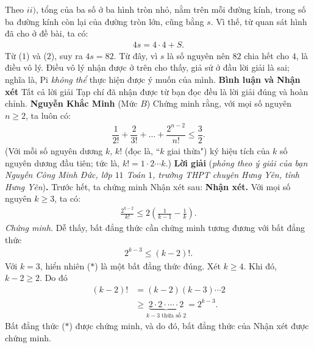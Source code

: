\begin{multicols}{2}
	\vskip 0.05cm
	Theo $ii)$, tổng của ba số ở ba hình tròn nhỏ, nằm trên mỗi đường kính, trong số ba đường kính còn lại của đường tròn lớn, cũng bằng $s$. Vì thế, từ quan sát hình đã cho ở đề bài, ta có:
	\begin{align*}
		4s = 4 \cdot 4 + S. \tag{$2$}
	\end{align*}
	Từ ($1$) và ($2$), suy ra $4s = 82$. Từ đây, vì $s$ là số nguyên nên $82$ chia hết cho $4$, là điều vô lý.
	\vskip 0.05cm
	Điều vô lý nhận được ở trên cho thấy, giả sử ở đầu lời giải là sai; nghĩa là, Pi \textit{không thể} thực hiện được ý muốn của mình.
	\vskip 0.05cm
	\textbf{\color{thachthuctoanhoc}Bình luận và Nhận xét}
	\vskip 0.05cm
	Tất cả lời giải Tạp chí đã nhận được từ bạn đọc đều là lời giải đúng và hoàn chỉnh.
	\vskip 0.15cm
	\hfill	\textbf{\color{thachthuctoanhoc}Nguyễn Khắc Minh}
	\vskip 0.15cm
	{}
	(Mức $B$) Chứng minh rằng, với mọi số nguyên $n\ge2$, ta luôn có:
	\begin{align*}
		\dfrac{1}{2!}+\dfrac{2}{3!}+\ldots+\dfrac{2^{n-2}}{n!}\le\dfrac{3}{2}.
	\end{align*}
	(Với mỗi số nguyên dương $k$, $k!$ (đọc là, ``$k$ giai thừa") ký hiệu tích của $k$ số nguyên dương đầu tiên; tức là, $k!=1\cdot2\cdots k$.)
	\vskip 0.05cm
	\textbf{\color{thachthuctoanhoc}Lời giải} (\textit{phỏng theo ý giải của bạn Nguyễn Công Minh Đức, lớp $11$ Toán $1$, trường THPT chuyên Hưng Yên, tỉnh Hưng Yên})\textbf{\color{thachthuctoanhoc}.}
	\vskip 0.05cm
	Trước hết, ta chứng minh Nhận xét sau:
	\vskip 0.05cm
	\textbf{\color{thachthuctoanhoc}Nhận xét.} Với mọi số nguyên $k \ge 3$, ta có:
	\begin{align*}
		\frac{{{2^{k - 2}}}}{{k!}} \le 2\left( {\frac{1}{{k - 1}} - \frac{1}{k}} \right).
	\end{align*}
	\textit{Chứng minh.} Dễ thấy, bất đẳng thức cần chứng minh tương đương với bất đẳng thức
	\begin{align*}
		{2^{k - 3}} \le \left( {k - 2} \right)!. \tag{$*$}
	\end{align*}
	Với $k = 3$, hiển nhiên ($*$) là một bất đẳng thức đúng.
	\vskip 0.05cm
	Xét $k \ge 4$. Khi đó, $k - 2 \ge 2$. Do đó
	\begin{align*}
		\left( {k - 2} \right)! &= \left( {k - 2} \right)\left( {k - 3} \right) \cdots 2 \\
		&\ge \underbrace {2 \cdot 2 \cdot  \cdots  \cdot 2}_{k - 3\text{ thừa số }2} = {2^{k - 3}}.
	\end{align*}
	Bất đẳng thức ($*$) được chứng minh, và do đó, bất đẳng thức của Nhận xét được chứng minh.

\end{multicols}
